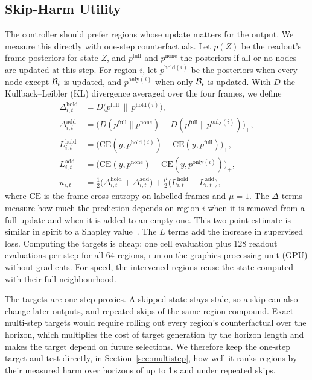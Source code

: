 \subsection{Skip-Harm Utility}
\label{sec:utility}
The controller should prefer regions whose update matters for the output. We measure this directly with one-step counterfactuals. Let $p(Z)$ be the readout's frame posteriors for state $Z$, and $p^{\mathrm{full}}$ and $p^{\mathrm{none}}$ the posteriors if all or no nodes are updated at this step. For region $i$, let $p^{\mathrm{hold}(i)}$ be the posteriors when every node except $\mathcal{B}_i$ is updated, and $p^{\mathrm{only}(i)}$ when only $\mathcal{B}_i$ is updated. With $D$ the Kullback--Leibler (KL) divergence averaged over the four frames, we define
\begin{align}
\Delta^{\mathrm{hold}}_{i,t} &= D\big(p^{\mathrm{full}}\,\|\,p^{\mathrm{hold}(i)}\big),\nonumber\\
\Delta^{\mathrm{add}}_{i,t} &= \big(D(p^{\mathrm{full}}\|p^{\mathrm{none}})-D(p^{\mathrm{full}}\|p^{\mathrm{only}(i)})\big)_+,\nonumber\\
L^{\mathrm{hold}}_{i,t} &= \big(\mathrm{CE}(y,p^{\mathrm{hold}(i)})-\mathrm{CE}(y,p^{\mathrm{full}})\big)_+,\nonumber\\
L^{\mathrm{add}}_{i,t} &= \big(\mathrm{CE}(y,p^{\mathrm{none}})-\mathrm{CE}(y,p^{\mathrm{only}(i)})\big)_+,\nonumber\\
u_{i,t} &= \tfrac12\big(\Delta^{\mathrm{hold}}_{i,t}+\Delta^{\mathrm{add}}_{i,t}\big)+\tfrac{\mu}{2}\big(L^{\mathrm{hold}}_{i,t}+L^{\mathrm{add}}_{i,t}\big),
\label{eq:utility}
\end{align}
where $\mathrm{CE}$ is the frame cross-entropy on labelled frames and $\mu{=}1$. The $\Delta$ terms measure how much the prediction depends on region $i$ when it is removed from a full update and when it is added to an empty one. This two-point estimate is similar in spirit to a Shapley value~\cite{lundberg2017unified}. The $L$ terms add the increase in supervised loss. Computing the targets is cheap: one cell evaluation plus 128 readout evaluations per step for all 64 regions, run on the graphics processing unit (GPU) without gradients. For speed, the intervened regions reuse the state computed with their full neighbourhood.

The targets are one-step proxies. A skipped state stays stale, so a skip can also change later outputs, and repeated skips of the same region compound. Exact multi-step targets would require rolling out every region's counterfactual over the horizon, which multiplies the cost of target generation by the horizon length and makes the target depend on future selections. We therefore keep the one-step target and test directly, in Section~\ref{sec:multistep}, how well it ranks regions by their measured harm over horizons of up to 1\,s and under repeated skips.

